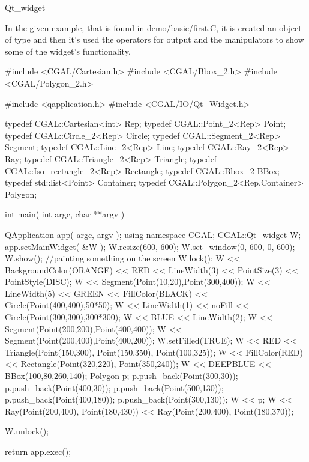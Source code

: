 \begin{ccRefClass}{Qt_widget}
\begin{ccAdvanced}
\end{ccAdvanced}







\ccExample

In the given example, that is found in demo/basic/first.C, it is created an 
object of type  and then it's used the operators for output and the
manipulators to show some of the widget's functionality.

\begin{ccExampleCode}
#include <CGAL/Cartesian.h>
#include <CGAL/Bbox_2.h>
#include <CGAL/Polygon_2.h>

#include <qapplication.h>
#include <CGAL/IO/Qt_Widget.h>

typedef CGAL::Cartesian<int> Rep;
typedef CGAL::Point_2<Rep> Point;
typedef CGAL::Circle_2<Rep> Circle;
typedef CGAL::Segment_2<Rep> Segment;
typedef CGAL::Line_2<Rep> Line;
typedef CGAL::Ray_2<Rep> Ray;
typedef CGAL::Triangle_2<Rep> Triangle;
typedef CGAL::Iso_rectangle_2<Rep> Rectangle;
typedef CGAL::Bbox_2 BBox;
typedef std::list<Point> Container;
typedef CGAL::Polygon_2<Rep,Container> Polygon;

int main( int argc, char **argv )
{
    QApplication app( argc, argv );
    using namespace CGAL;
    CGAL::Qt_widget W;
    app.setMainWidget( &W );
    W.resize(600, 600);
    W.set_window(0, 600, 0, 600);
    W.show();
    //painting something on the screen
    W.lock();
    W << BackgroundColor(ORANGE) << RED <<
	  LineWidth(3) << PointSize(3) << PointStyle(DISC);
    W << Segment(Point(10,20),Point(300,400));
    W << LineWidth(5) << GREEN << FillColor(BLACK) <<
      Circle(Point(400,400),50*50);
    W << LineWidth(1) << noFill << Circle(Point(300,300),300*300);
    W << BLUE << LineWidth(2);
    W << Segment(Point(200,200),Point(400,400));
    W << Segment(Point(200,400),Point(400,200));
    W.setFilled(TRUE);
    W << RED << Triangle(Point(150,300),
				   Point(150,350),
				   Point(100,325));
    W << FillColor(RED) << Rectangle(Point(320,220),
					       Point(350,240));
    W << DEEPBLUE << BBox(100,80,260,140);
    Polygon p;
    p.push_back(Point(300,30));
    p.push_back(Point(400,30));
    p.push_back(Point(500,130));
    p.push_back(Point(400,180));
    p.push_back(Point(300,130));
    W << p;
    W << Ray(Point(200,400), Point(180,430))
      << Ray(Point(200,400), Point(180,370));
    
    W.unlock();

    return app.exec();
}
\end{ccExampleCode}


\end{ccRefClass}







